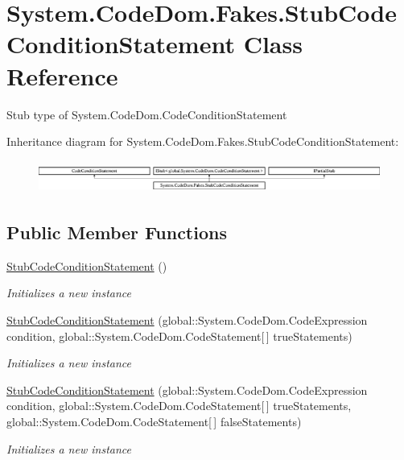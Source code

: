 \hypertarget{class_system_1_1_code_dom_1_1_fakes_1_1_stub_code_condition_statement}{\section{System.\-Code\-Dom.\-Fakes.\-Stub\-Code\-Condition\-Statement Class Reference}
\label{class_system_1_1_code_dom_1_1_fakes_1_1_stub_code_condition_statement}
}


Stub type of System.\-Code\-Dom.\-Code\-Condition\-Statement 


Inheritance diagram for System.\-Code\-Dom.\-Fakes.\-Stub\-Code\-Condition\-Statement\-:\begin{figure}[H]
\begin{center}
\leavevmode
\includegraphics[height=1.066667cm]{class_system_1_1_code_dom_1_1_fakes_1_1_stub_code_condition_statement}
\end{center}
\end{figure}
\subsection*{Public Member Functions}
\begin{DoxyCompactItemize}
\item 
\hyperlink{class_system_1_1_code_dom_1_1_fakes_1_1_stub_code_condition_statement_ab49fe782dc81c84103192ea92488272c}{Stub\-Code\-Condition\-Statement} ()
\begin{DoxyCompactList}\small\item\em Initializes a new instance\end{DoxyCompactList}\item 
\hyperlink{class_system_1_1_code_dom_1_1_fakes_1_1_stub_code_condition_statement_a1573fe047e0dea445e804a98d28224ec}{Stub\-Code\-Condition\-Statement} (global\-::\-System.\-Code\-Dom.\-Code\-Expression condition, global\-::\-System.\-Code\-Dom.\-Code\-Statement\mbox{[}$\,$\mbox{]} true\-Statements)
\begin{DoxyCompactList}\small\item\em Initializes a new instance\end{DoxyCompactList}\item 
\hyperlink{class_system_1_1_code_dom_1_1_fakes_1_1_stub_code_condition_statement_a5ff651d9924d9ad640e6200414f12d5a}{Stub\-Code\-Condition\-Statement} (global\-::\-System.\-Code\-Dom.\-Code\-Expression condition, global\-::\-System.\-Code\-Dom.\-Code\-Statement\mbox{[}$\,$\mbox{]} true\-Statements, global\-::\-System.\-Code\-Dom.\-Code\-Statement\mbox{[}$\,$\mbox{]} false\-Statements)
\begin{DoxyCompactList}\small\item\em Initializes a new instance\end{DoxyCompactList}\end{DoxyCompactItemize}
